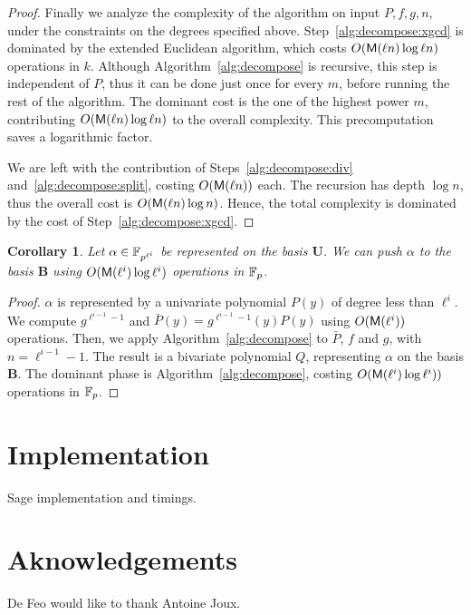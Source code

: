 \documentclass{sig-alternate}
\newtheorem{corollary}[definition]{Corollary}
\newcommand{\bb}{\mathbf{B}}
\newcommand{\uu}{\mathbf{U}}  %
\begin{document}
\begin{proof}
  Finally we analyze the complexity of the algorithm on input $P, f,
  g, n$, under the constraints on the degrees specified
  above. Step~\ref{alg:decompose:xgcd} is dominated by the extended
  Euclidean algorithm, which costs $O(\mathsf{M}(\ell n)\log \ell n)$
  operations in $k$. Although Algorithm~\ref{alg:decompose} is
  recursive, this step is independent of $P$, thus it can be done just
  once for every $m$, before running the rest of the algorithm. The
  dominant cost is the one of the highest power $m$, contributing
  $O(\mathsf{M}(\ell n)\log \ell n)$ to the overall complexity. This
  precomputation saves a logarithmic factor.

  We are left with the contribution of Steps~\ref{alg:decompose:div}
  and~\ref{alg:decompose:split}, costing $O(\mathsf{M}(\ell n))$ each. The
  recursion has depth $\log n$, thus the overall cost is $O(\mathsf{M}(\ell
  n)\log n)$. Hence, the total complexity is dominated by the cost of
  Step~\ref{alg:decompose:xgcd}.
\end{proof}

\begin{corollary}
  Let $\alpha\in\mathbb{F}_{p^{\ell^i}}$ be represented on the basis $\uu$. We
  can \emph{push} $\alpha$ to the basis $\bb$ using
  $O(\mathsf{M}(\ell^i)\log\ell^i)$ operations in $\mathbb{F}_p$.
\end{corollary}
\begin{proof}
  $\alpha$ is represented by a univariate polynomial $P(y)$ of degree
  less than $\ell^i$. We compute $g^{\ell^{i-1}-1}$ and $\bar{P}(y) =
  g^{\ell^{i-1}-1}(y)P(y)$ using $O(\mathsf{M}(\ell^i))$ operations. Then,
  we apply Algorithm~\ref{alg:decompose} to $\bar{P}$, $f$ and $g$,
  with $n=\ell^{i-1}-1$. The result is a bivariate polynomial $Q$,
  representing $\alpha$ on the basis $\mathbf{B}$. The dominant phase
  is Algorithm~\ref{alg:decompose}, costing
  $O(\mathsf{M}(\ell^i)\log\ell^i))$ operations in $\mathbb{F}_p$.
\end{proof}


\section{Implementation}
\label{sec:impl}

Sage implementation and timings.


\section{Aknowledgements}
De Feo would like to thank Antoine Joux.

\scriptsize


\end{document}
